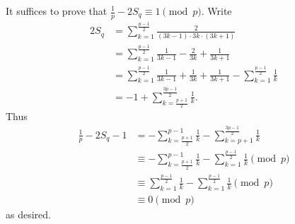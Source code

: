 It suffices to prove that $\frac{1}{p}-2S_q\equiv1\pmod p$. Write
\begin{align*}
	2S_q&=\displaystyle\sum_{k=1}^{\frac{p-1}{2}}\frac{2}{(3k-1)\cdot3k\cdot(3k+1)}\\
	&=\displaystyle\sum_{k=1}^{\frac{p-1}{2}}\frac{1}{3k-1}-\frac{2}{3k}+\frac{1}{3k+1}\\
	&=\displaystyle\sum_{k=1}^{\frac{p-1}{2}}\frac{1}{3k-1}+\frac{1}{3k}+\frac{1}{3k+1}-\displaystyle\sum_{k=1}^{\frac{p-1}{2}}\frac{1}{k}\\
	&=-1+\displaystyle\sum_{k=\frac{p+1}{2}}^{\frac{3p-1}{2}}\frac{1}{k}.
\end{align*}
Thus
\begin{align*}
	\frac{1}{p}-2S_q-1&=-\displaystyle\sum_{k=\frac{p+1}{2}}^{p-1}\frac{1}{k}-\displaystyle\sum_{k=p+1}^{\frac{3p-1}{2}}\frac{1}{k}\\
	&\equiv-\displaystyle\sum_{k=\frac{p+1}{2}}^{p-1}\frac{1}{k}-\displaystyle\sum_{k=1}^{\frac{p-1}{2}}\frac{1}{k}\pmod p\\
	&\equiv\displaystyle\sum_{k=1}^{\frac{p-1}{2}}\frac{1}{k}-\displaystyle\sum_{k=1}^{\frac{p-1}{2}}\frac{1}{k}\pmod p\\
	&\equiv0\pmod p
\end{align*}
as desired.